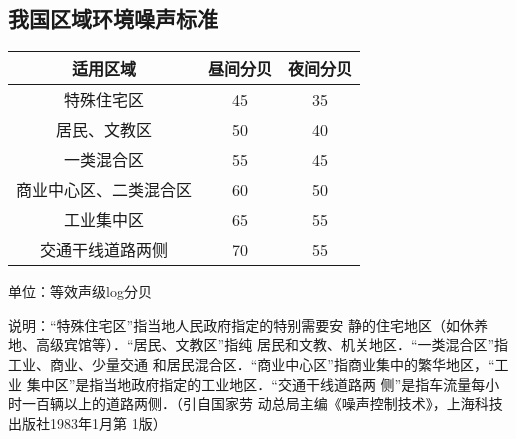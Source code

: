 \subsection{我国区域环境噪声标准}

\begin{center}
    \begin{tabular}{ccc}
        \hline
        适用区域&昼间分贝&夜间分贝\\
        \hline
特殊住宅区&45&35\\
居民、文教区&50&40\\
一类混合区&55&45\\
商业中心区、二类混合区&60&50\\
工业集中区&65&55\\
交通干线道路两侧&70&55\\
        \hline
    \end{tabular}

    单位：等效声级log分贝
\end{center}

说明：“特殊住宅区”指当地人民政府指定的特别需要安
静的住宅地区（如休养地、高级宾馆等）．“居民、文教区”指纯
居民和文教、机关地区．“一类混合区”指工业、商业、少量交通
和居民混合区．“商业中心区”指商业集中的繁华地区，“工业
集中区”是指当地政府指定的工业地区．“交通干线道路两
侧”是指车流量每小时一百辆以上的道路两侧．（引自国家劳
动总局主编《噪声控制技术》，上海科技出版社1983年1月第
1版）






